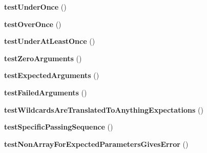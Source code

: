 \begin{DoxyCompactItemize}
\item 
\hypertarget{class_test_of_mock_expectations_a271267893d6c38b99199c49915052505}{
{\bfseries testUnderOnce} ()}
\label{class_test_of_mock_expectations_a271267893d6c38b99199c49915052505}

\item 
\hypertarget{class_test_of_mock_expectations_a3146b31518c7b3165ab703ed78c2215b}{
{\bfseries testOverOnce} ()}
\label{class_test_of_mock_expectations_a3146b31518c7b3165ab703ed78c2215b}

\item 
\hypertarget{class_test_of_mock_expectations_a3e4ad29cb581870b95358d875e6d0d82}{
{\bfseries testUnderAtLeastOnce} ()}
\label{class_test_of_mock_expectations_a3e4ad29cb581870b95358d875e6d0d82}

\item 
\hypertarget{class_test_of_mock_expectations_a246e3adee58b0a217b757e700e2fdc6e}{
{\bfseries testZeroArguments} ()}
\label{class_test_of_mock_expectations_a246e3adee58b0a217b757e700e2fdc6e}

\item 
\hypertarget{class_test_of_mock_expectations_ae13ff9b25c41a10964f301316f161ff0}{
{\bfseries testExpectedArguments} ()}
\label{class_test_of_mock_expectations_ae13ff9b25c41a10964f301316f161ff0}

\item 
\hypertarget{class_test_of_mock_expectations_a91f719d8f77e14ff90d200e3b58fc8f6}{
{\bfseries testFailedArguments} ()}
\label{class_test_of_mock_expectations_a91f719d8f77e14ff90d200e3b58fc8f6}

\item 
\hypertarget{class_test_of_mock_expectations_a5f30d2253b192f2bcc780c0fa306f6f6}{
{\bfseries testWildcardsAreTranslatedToAnythingExpectations} ()}
\label{class_test_of_mock_expectations_a5f30d2253b192f2bcc780c0fa306f6f6}

\item 
\hypertarget{class_test_of_mock_expectations_aaf53b10c53b4c3c8571a9904b564d3e6}{
{\bfseries testSpecificPassingSequence} ()}
\label{class_test_of_mock_expectations_aaf53b10c53b4c3c8571a9904b564d3e6}

\item 
\hypertarget{class_test_of_mock_expectations_a34ea80f2f7f0aa2d2a411606678af2ef}{
{\bfseries testNonArrayForExpectedParametersGivesError} ()}
\label{class_test_of_mock_expectations_a34ea80f2f7f0aa2d2a411606678af2ef}

\end{DoxyCompactItemize}

